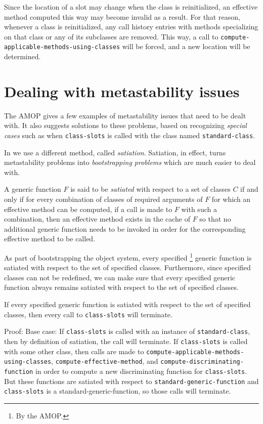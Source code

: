 Since the location of a slot may change when the class is
reinitialized, an effective method computed this way may become
invalid as a result.  For that reason, whenever a class is
reinitialized, any call history entries with methods specializing on
that class or any of its subclasses are removed.  This way, a call to
\texttt{compute-applicable-methods-using-classes} will be forced, and
a new location will be determined.

\section{Dealing with metastability issues}
\label{sec-object-system-dealing-with-metastability-issues}

The AMOP gives a few examples of metastability issues that need to be
dealt with.  It also suggests solutions to these problems, based on
recognizing \emph{special cases} such as when \texttt{class-slots} is
called with the class named \texttt{standard-class}.  

In \sysname{} we use a different method, called \emph{satiation}. 
Satiation, in effect, turns metastability problems into
\emph{bootstrapping problems} which are much easier to deal with.

\begin{definition}
A generic function $F$ is said to be \emph{satiated} with respect to a
set of classes $C$ if and only if for every combination of classes of
required arguments of $F$ for which an effective method can be
computed, if a call is made to $F$ with such a combination, then an
effective method exists in the cache of $F$ so that no additional
generic function needs to be invoked in order for the corresponding
effective method to be called.
\end{definition}

As part of bootstrapping the object system, every specified%
\footnote{By the AMOP.} generic function is satiated with respect to
the set of specified classes.  Furthermore, since specified classes
can not be redefined, we can make sure that every specified generic
function always remains satiated with respect to the set of specified
classes.

\begin{theorem}
If every specified generic function is satiated with respect to the
set of specified classes, then every call to \texttt{class-slots} will
terminate.
\end{theorem}

Proof: Base case: If \texttt{class-slots} is called with an instance
of \texttt{standard-class}, then by definition of satiation, the call
will terminate.  If \texttt{class-slots} is called with some other
class, then calls are made to
\texttt{compute-applicable-methods-using-classes},
\texttt{compute-effective-method}, and
\texttt{compute-discriminating-function} in order to compute a new
discriminating function for \texttt{class-slots}.  But these functions
are satiated with respect to \texttt{standard-generic-function} and
\texttt{class-slots} is a standard-generic-function, so those calls
will terminate. 

